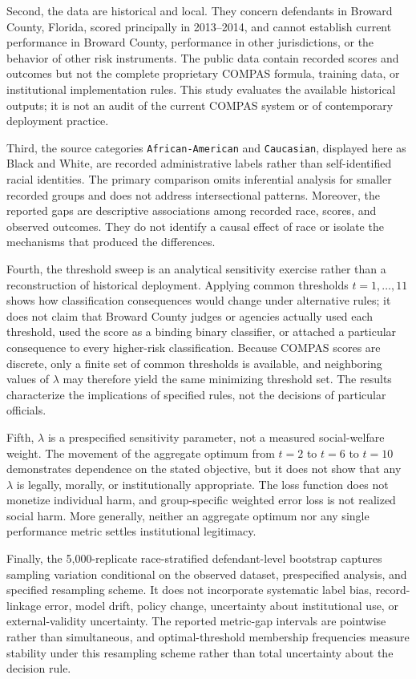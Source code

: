 \documentclass[11pt,letterpaper]{article}
\begin{document}
Second, the data are historical and local. They concern defendants in Broward County, Florida, scored principally in 2013--2014, and cannot establish current performance in Broward County, performance in other jurisdictions, or the behavior of other risk instruments. The public data contain recorded scores and outcomes but not the complete proprietary COMPAS formula, training data, or institutional implementation rules. This study evaluates the available historical outputs; it is not an audit of the current COMPAS system or of contemporary deployment practice.

Third, the source categories \texttt{African-American} and \texttt{Caucasian}, displayed here as Black and White, are recorded administrative labels rather than self-identified racial identities. The primary comparison omits inferential analysis for smaller recorded groups and does not address intersectional patterns. Moreover, the reported gaps are descriptive associations among recorded race, scores, and observed outcomes. They do not identify a causal effect of race or isolate the mechanisms that produced the differences.

Fourth, the threshold sweep is an analytical sensitivity exercise rather than a reconstruction of historical deployment. Applying common thresholds $t=1,\ldots,11$ shows how classification consequences would change under alternative rules; it does not claim that Broward County judges or agencies actually used each threshold, used the score as a binding binary classifier, or attached a particular consequence to every higher-risk classification. Because COMPAS scores are discrete, only a finite set of common thresholds is available, and neighboring values of $\lambda$ may therefore yield the same minimizing threshold set. The results characterize the implications of specified rules, not the decisions of particular officials.

Fifth, $\lambda$ is a prespecified sensitivity parameter, not a measured social-welfare weight. The movement of the aggregate optimum from $t=2$ to $t=6$ to $t=10$ demonstrates dependence on the stated objective, but it does not show that any $\lambda$ is legally, morally, or institutionally appropriate. The loss function does not monetize individual harm, and group-specific weighted error loss is not realized social harm. More generally, neither an aggregate optimum nor any single performance metric settles institutional legitimacy.

Finally, the 5,000-replicate race-stratified defendant-level bootstrap captures sampling variation conditional on the observed dataset, prespecified analysis, and specified resampling scheme. It does not incorporate systematic label bias, record-linkage error, model drift, policy change, uncertainty about institutional use, or external-validity uncertainty. The reported metric-gap intervals are pointwise rather than simultaneous, and optimal-threshold membership frequencies measure stability under this resampling scheme rather than total uncertainty about the decision rule.
\end{document}
